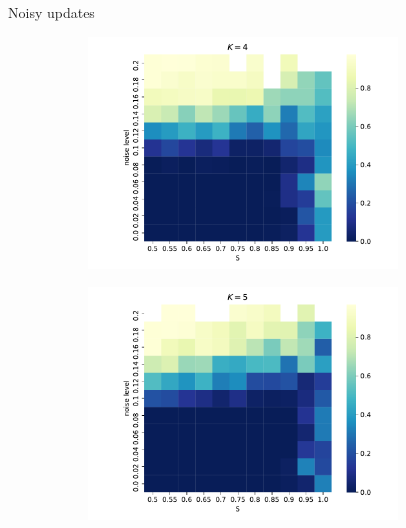 \documentclass[11pt]{beamer}
\begin{document}
\begin{frame}{Noisy updates}
\begin{figure}[t!]
\begin{subfigure}[t]{0.49\textwidth}
        \includegraphics[width=0.9\textwidth]{Figures/p_v_noise_k=4.pdf}
    \end{subfigure}
    \begin{subfigure}[t]{0.49\textwidth}
        \centering
        \includegraphics[width=0.9\textwidth]{Figures/p_v_noise_k=5.pdf}
    \end{subfigure}
    \label{fig:heatmaps}
  \end{figure}
\end{frame}
\end{document}

